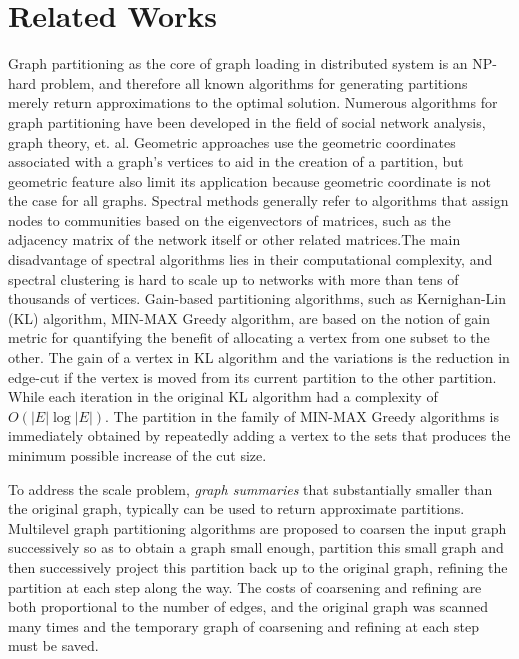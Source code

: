 \documentclass{sig-alternate-2013}
\begin{document}
\section{Related Works}

Graph partitioning as the core of graph loading in distributed system is an NP-hard problem, and therefore all known algorithms for generating partitions merely return approximations to the optimal solution. Numerous algorithms for graph partitioning have been developed in the field of social network analysis, graph theory, et. al. Geometric approaches use the geometric coordinates associated with a graph's vertices to aid in the creation of a partition, but geometric feature also limit its application because geometric coordinate is not the case for all graphs. Spectral methods generally refer to algorithms that assign nodes to communities based on the eigenvectors of matrices, such as the adjacency matrix of the network itself or other related matrices\cite{Luxburg:spectralcluster}.The main disadvantage of spectral algorithms lies in their computational complexity, and spectral clustering is hard to scale up to networks with more than tens of thousands of vertices. Gain-based partitioning algorithms, such as Kernighan-Lin (KL) algorithm\cite{Fiduccia:klvar, Kernighan:kl}, MIN-MAX Greedy algorithm\cite{Battiti:minmaxgreedy, Laguna:greedy}, are based on the notion of gain metric for quantifying the benefit of allocating a vertex from one subset to the other. The gain of a vertex in KL algorithm and the variations is the reduction in edge-cut if the vertex is moved from its current partition to the other partition. While each iteration in the original KL algorithm had a complexity of $O(|E|\log{|E|})$. The partition in the family of MIN-MAX Greedy algorithms is immediately obtained by repeatedly adding a vertex to the sets that produces the minimum possible increase of the cut size.

To address the scale problem, \emph{graph summaries} that substantially smaller than the original graph, typically can be used to return approximate partitions. Multilevel graph partitioning algorithms \cite{Lang:multilevel, Teng:multilevel, Dhillon:multilevel} are proposed  to coarsen the input graph successively so as to obtain a graph small enough, partition this small graph and then successively project this partition back up to the original graph, refining the partition at each step along the way. The costs of coarsening and refining are both proportional to the number of edges, and the original graph was scanned many times and the temporary graph of coarsening and refining at each step must be saved.
\end{document}
